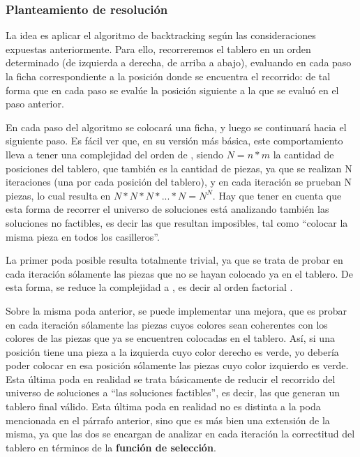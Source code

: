 \documentclass[11pt, a4paper, twoside]{article}
\begin{document}
\subsubsection{Planteamiento de resolución} 


La idea es aplicar el algoritmo de backtracking según las consideraciones expuestas anteriormente. Para ello, recorreremos el tablero en un orden determinado (de izquierda a derecha, de arriba a abajo), evaluando en cada paso la ficha correspondiente a la posición donde se encuentra el recorrido: de tal forma que en cada paso se evalúe la posición siguiente a la que se evaluó en el paso anterior.

En cada paso del algoritmo se colocará una ficha, y luego se continuará hacia el siguiente paso. Es fácil ver que, en su versión más básica, este comportamiento lleva a tener una complejidad del orden de , siendo $N=n*m$ la cantidad de posiciones del tablero, que también es la cantidad de piezas, ya que se realizan N iteraciones (una por cada posición del tablero), y en cada iteración se prueban N piezas, lo cual resulta en $N*N*N*...*N = N^N$. Hay que tener en cuenta que esta forma de recorrer el universo de soluciones está analizando también las soluciones no factibles, es decir las que resultan imposibles, tal como ``colocar la misma pieza en todos los casilleros''.


La primer poda posible resulta totalmente trivial, ya que se trata de probar en cada iteración sólamente las piezas que no se hayan colocado ya en el tablero. De esta forma, se reduce la complejidad a , es decir al orden factorial .

Sobre la misma poda anterior, se puede implementar una mejora, que es probar en cada iteración sólamente las piezas cuyos colores sean coherentes con los colores de las piezas que ya se encuentren colocadas en el tablero. Así, si una posición tiene una pieza a la izquierda cuyo color derecho es verde, yo debería poder colocar en esa posición sólamente las piezas cuyo color izquierdo es verde. Esta última poda en realidad se trata básicamente de reducir el recorrido del universo de soluciones a ``las soluciones factibles'', es decir, las que generan un tablero final válido. Esta última poda en realidad no es distinta a la poda mencionada en el párrafo anterior, sino que es más bien una extensión de la misma, ya que las dos se encargan de analizar en cada iteración la correctitud del tablero en términos de la \textbf{función de selección}.
\end{document}

